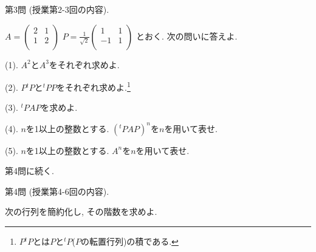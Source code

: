 \documentclass[dvipdfmx,a4paper,11pt]{article}
\theoremstyle{definition}
\begin{document}

 \vspace{33pt}
 
   
   {\Large 第3問} (授業第2-3回の内容).
    \vspace{11pt}
    
    $
A = \begin{pmatrix} %
2 & 1\\
1 & 2\\
 \end{pmatrix}
 $
 $
P =\frac{1}{\sqrt{2}} 
\begin{pmatrix} %
1& 1\\
-1 & 1\\
 \end{pmatrix}
 $
 とおく. 次の問いに答えよ.
     \vspace{11pt}
 
(1). $A^2$と$A^3$をそれぞれ求めよ.
 
(2). $P{}^tP$と${}^t PP$をそれぞれ求めよ.\footnote{$P{}^tP$とは$P$と${}^tP$($P$の転置行列)の積である.}

(3). ${}^tP A P$を求めよ.

(4). $n$を1以上の整数とする. $({}^tP A P)^n$を$n$を用いて表せ.

(5). $n$を1以上の整数とする. $A^n$を$n$を用いて表せ.

     \vspace{33pt} 
     
  \begin{flushright}
 {\LARGE 第4問に続く.}
 \end{flushright}
     
 \newpage
 
 {\Large 第4問} (授業第4-6回の内容).
 
    \vspace{11pt}
 次の行列を簡約化し, その階数を求めよ.
 
\end{document}
